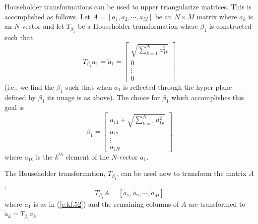 	Householder transformations can be used to 
upper triangularize matrices.  This is accomplished as
follows.  Let $A=[a_1,a_2,\cdots,a_M]$ be an $N\times M$ matrix
where $a_k$ is an $N$-vector and let $T_{\beta_1}$ be a 
Householder transformation where $\beta_1$ is
constructed such that
%
\begin{equation}
T_{\beta_1}a_1=\tilde{a}_1=
                     \left[\begin{array}{c}
                          \sqrt{\sum_{k=1}^{N}a_{1k}^2}\\
                          0\\
                          \vdots\\
                          0
                      \end{array}\right]
\label{e.kf.52}
\end{equation}
%
(i.e., we find the $\beta_1$ such that when $a_1$ is reflected
through the hyper-plane defined by $\beta_1$ its image is
as above).  The choice for $\beta_1$ which accomplishes this goal is
%
\begin{equation}
\beta_1=\left[\begin{array}{c}
                          a_{11}+\sqrt{\sum_{k=1}^{N}a_{1k}^2}\\
                          a_{12}\\
                          \vdots\\
                          a_{1N}
                      \end{array}\right]
\label{e.kf.53}
\end{equation}
%
where $a_{1k}$ is the $k^{th}$ element of the $N$-vector $a_1$.

	The Householder transformation, $T_{\beta_1}$, can be
used now to transform the matrix $A$,
%
\begin{equation}
T_{\beta_1}A=[\tilde{a}_1,\tilde{a}_2,\cdots,\tilde{a}_M]
\label{e.kf.54}
\end{equation}
%
where $\tilde{a}_1$ is as in (\ref{e.kf.52}) and the 
remaining columns of $A$ are transformed to $\tilde{a}_k=T_{\beta_1}a_k$.

